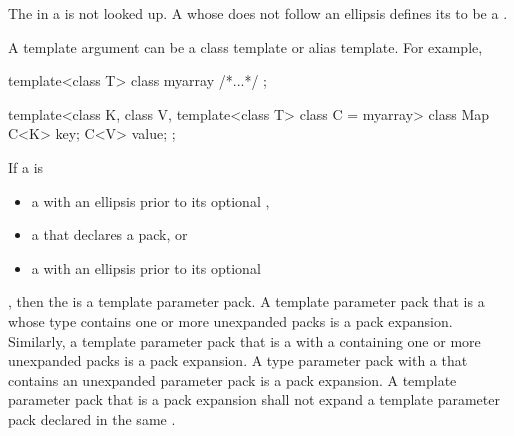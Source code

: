 \documentclass{wg21}
\begin{document}
\begin{addedblock}
The  in a  is not looked up.
A  whose  does not follow an ellipsis defines its
 to be a .
\end{addedblock}

\begin{note}
A template argument can be a class template or alias template.
For example,

\begin{codeblock}
    template<class T> class myarray { /*...*/ };

    template<class K, class V, template<class T> class C = myarray>
    class Map {
        C<K> key;
        C<V> value;
    };
\end{codeblock}
\end{note}


\pnum
If a  is 
\begin{addedblock}
\begin{itemize}
\item a  with an ellipsis prior to its optional ,
\item a  that declares a pack, or
\item a  with an ellipsis prior to its optional 
\end{itemize}
\end{addedblock}
, then the 
is a template parameter pack.
A template parameter pack that is a  whose type
contains one or more unexpanded packs is a pack expansion. Similarly,
a template parameter pack that is a  with a
 containing one or more unexpanded
packs is a pack expansion.
A type parameter pack with a  that
contains an unexpanded parameter pack is a pack expansion.
A template parameter pack that is a pack
expansion shall not expand a template parameter pack declared in the same
.
\end{document}
